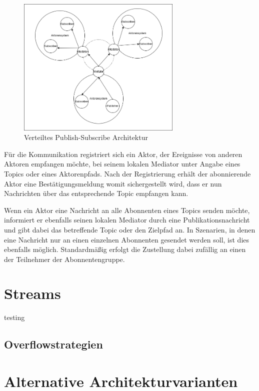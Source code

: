 \begin{figure}[H]
    \centering
    \includegraphics[width=0.7\textwidth]{assets/dis-p_s.png}
    \caption{Verteiltes Publish-Subscribe Architektur \parencite{distributed_petabridge}}
    \label{fig:distribute-pub-sub}
\end{figure}

Für die Kommunikation registriert sich ein Aktor, der Ereignisse von anderen Aktoren empfangen möchte, bei seinem 
lokalen Mediator unter Angabe eines Topics oder eines Aktorenpfads. Nach der Registrierung erhält der abonnierende 
Aktor eine Bestätigungsmeldung womit sichergestellt wird, dass er nun Nachrichten über das entsprechende Topic 
empfangen kann.

Wenn ein Aktor eine Nachricht an alle Abonnenten eines Topics senden möchte, informiert er ebenfalls seinen lokalen 
Mediator durch eine Publikationsnachricht und gibt dabei das betreffende Topic oder den Zielpfad an. In Szenarien, 
in denen eine Nachricht nur an einen einzelnen Abonnenten gesendet werden soll, ist dies ebenfalls möglich. 
Standardmäßig erfolgt die Zustellung dabei zufällig an einen der Teilnehmer der Abonnentengruppe.
\parencite{distributed_petabridge}

\section{Streams}

testing

\subsection{Overflowstrategien}


\section{Alternative Architekturvarianten}
